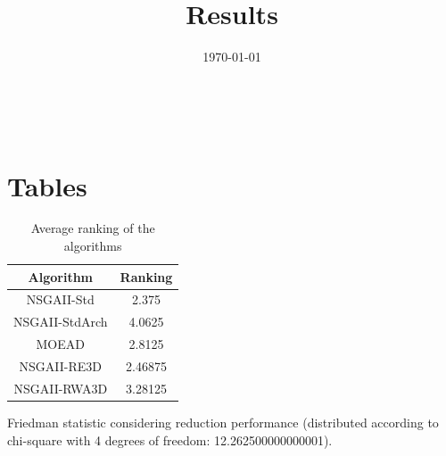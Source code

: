 \documentclass{article}
\title{Results}
\author{}
\date{\today}
\begin{document}
\oddsidemargin 0in \topmargin 0in\maketitle
\
\section{Tables}
\begin{table}[!htp]
\centering
\caption{Average ranking of the algorithms}
\begin{tabular}{c|c}
Algorithm&Ranking\\
\hline
NSGAII-Std&2.375\\
NSGAII-StdArch&4.0625\\
MOEAD&2.8125\\
NSGAII-RE3D&2.46875\\
NSGAII-RWA3D&3.28125\\
\end{tabular}
\end{table}


Friedman statistic considering reduction performance (distributed according to chi-square with 4 degrees of freedom: 12.262500000000001).
\end{document}
